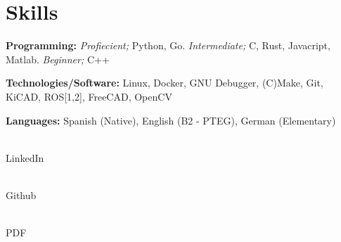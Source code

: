 \documentclass[letterpaper,11pt]{article}
\newcommand{\resumeSubHeadingListStart}{\begin{itemize}[leftmargin=0.15in, label={}]}
\newcommand{\resumeSubHeadingListEnd}{\end{itemize}}
\begin{document}

\section{Skills}
  \vspace{2pt}
  \resumeSubHeadingListStart
    \small{\item{
        \textbf{Programming:}{
	    \textit{Profiecient;} Python, Go.
	    \textit{Intermediate;} C, Rust, Javacript, Matlab.
	    \textit{Beginner;} C++} \\
	\vspace{3pt}
        
	\textbf{Technologies/Software:}{ Linux, Docker, GNU Debugger, (C)Make, Git, KiCAD, ROS[1,2], FreeCAD, OpenCV} \\ \vspace{3pt}
        
        \textbf{Languages:}{ Spanish (Native), English (B2 - PTEG), German (Elementary)}
        
    }}
  \resumeSubHeadingListEnd


\setlength{\columnsep}{-10cm} %

\begin{center}
    \begin{multicols}{3}
	 \vspace{1.2pt} \\ LinkedIn

	 \vspace{1.2pt} \\ Github

	 \vspace{1.2pt} \\ PDF
    \end{multicols}
\end{center}
\end{document}
